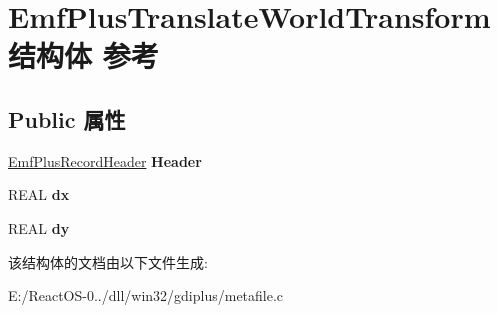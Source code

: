 \hypertarget{struct_emf_plus_translate_world_transform}{}\section{Emf\+Plus\+Translate\+World\+Transform结构体 参考}
\label{struct_emf_plus_translate_world_transform}
\subsection*{Public 属性}
\begin{DoxyCompactItemize}
\item 
\mbox{\label{struct_emf_plus_translate_world_transform_a80b9cf1d47482b5ef1e84e649a343691}} 
\hyperlink{struct_emf_plus_record_header}{Emf\+Plus\+Record\+Header} {\bfseries Header}
\item 
\mbox{\label{struct_emf_plus_translate_world_transform_a13da4396e182efe325cb1e7c43bb64c9}} 
R\+E\+AL {\bfseries dx}
\item 
\mbox{\label{struct_emf_plus_translate_world_transform_aa12cc000d4d7a9747e5a97b6c344e9dc}} 
R\+E\+AL {\bfseries dy}
\end{DoxyCompactItemize}


该结构体的文档由以下文件生成\+:\begin{DoxyCompactItemize}
\item 
E\+:/\+React\+O\+S-\/0../dll/win32/gdiplus/metafile.\+c\end{DoxyCompactItemize}
